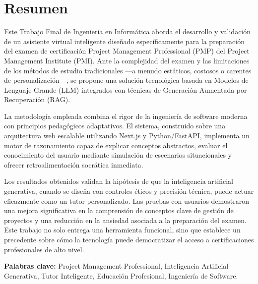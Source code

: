 \chapter*{Resumen}

Este Trabajo Final de Ingeniería en Informática aborda el desarrollo y validación de un asistente virtual inteligente diseñado específicamente para la preparación del examen de certificación Project Management Professional (PMP) del Project Management Institute (PMI). Ante la complejidad del examen y las limitaciones de los métodos de estudio tradicionales —a menudo estáticos, costosos o carentes de personalización—, se propone una solución tecnológica basada en Modelos de Lenguaje Grande (LLM) integrados con técnicas de Generación Aumentada por Recuperación (RAG).

La metodología empleada combina el rigor de la ingeniería de software moderna con principios pedagógicos adaptativos. El sistema, construido sobre una arquitectura web escalable utilizando Next.js y Python/FastAPI, implementa un motor de razonamiento capaz de explicar conceptos abstractos, evaluar el conocimiento del usuario mediante simulación de escenarios situacionales y ofrecer retroalimentación socrática inmediata.

Los resultados obtenidos validan la hipótesis de que la inteligencia artificial generativa, cuando se diseña con controles éticos y precisión técnica, puede actuar eficazmente como un tutor personalizado. Las pruebas con usuarios demostraron una mejora significativa en la comprensión de conceptos clave de gestión de proyectos y una reducción en la ansiedad asociada a la preparación del examen. Este trabajo no solo entrega una herramienta funcional, sino que establece un precedente sobre cómo la tecnología puede democratizar el acceso a certificaciones profesionales de alto nivel.

\vspace{1cm}
\textbf{Palabras clave:} Project Management Professional, Inteligencia Artificial Generativa, Tutor Inteligente, Educación Profesional, Ingeniería de Software.